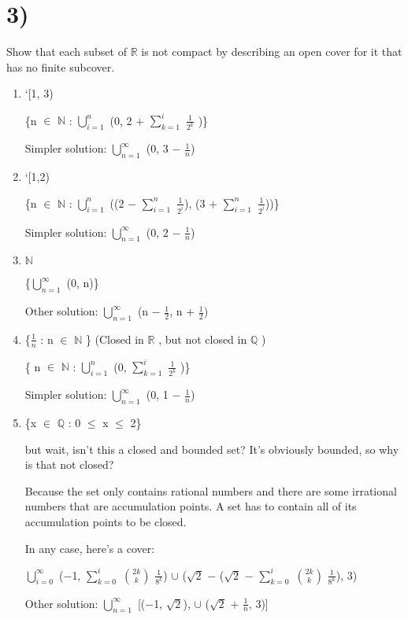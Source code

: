 \documentclass{article}
\newcommand{\mt}[1]{\ensuremath{#1}}
\newcommand\bsc[2][\DefaultOpt]{%
  \def\DefaultOpt{#2}%
  \section[#1]{#2}%
}
\newcommand{\balist}{\begin{enumerate}[label=\alph*.]}
\newcommand{\elist}{\end{enumerate}}
\newcommand{\br}{\mt{\mathbb{R}} }       %
\newcommand{\bq}{\mt{\mathbb{Q}} }       %
\newcommand{\bn}{\mt{\mathbb{N}} }       %
\newcommand{\mem}{\mt{\in} }
\newcommand{\frc}[2]{\mt{\frac{#1}{#2}}}
\newcommand{\urng}[2]{\mt{\bigcup_{#1}^{#2}}}
\newcommand{\nck}[2]{\mt{{#1 \choose #2}}}
\begin{document}
\bsc{3)}{
Show that each subset of \br is not compact by describing an open cover for it that has no finite subcover.

\balist
\item `[1, 3) 
	
	\{n \mem \bn : \urng{i = 1}{n} (0, 2 + $\sum_{k = 1}^i$ \frc{1}{2^k} )\}
	
	Simpler solution: \urng{n = 1}{\infty} (0, 3 $-$ \frc{1}{n})
\item `[1,2)
	
	\{n \mem \bn : \urng{i = 1}{n} ((2 $-$ $\sum_{i = 1}^n$ \frc{1}{2^i}), (3 $+$ $\sum_{i = 1}^n$ \frc{1}{2^i}))\}
	
	Simpler solution: \urng{n = 1}{\infty} (0, 2 $-$ \frc{1}{n})
\item \bn
	
	\{\urng{n = 1}{\infty} (0, n)\}
	
	Other solution: \urng{n = 1}{\infty} (n $-$ \frc{1}{2}, n $+$ \frc{1}{2})
\item \{\frc{1}{n} : n \mem \bn\} (Closed in \br, but not closed in \bq)
	
	\{ n \mem \bn: \urng{i = 1}{n} (0, $\sum_{k = 1}^i$ \frc{1}{2^k} )\}
	
	Simpler solution: \urng{n = 1}{\infty} (0, 1 $-$ \frc{1}{n})
\item \{x \mem \bq : 0 $\leq$ x $\leq$ 2\} 
	
	but wait, isn't this a closed and bounded set? It's obviously bounded, so why is that not closed?
	
	Because the set only contains rational numbers and there are some irrational numbers that are accumulation points. A set has to contain all of its accumulation points to be closed.
	
	In any case, here's a cover:
	
	\urng{i = 0}{\infty} ($-$1, $\sum_{k = 0}^i$ \nck{2k}{k} $\frac{1}{8^k}$) $\cup$ ($\sqrt{2}$ $-$ ($\sqrt{2}$ $-$ $\sum_{k = 0}^i$ \nck{2k}{k} $\frac{1}{8^k}$), 3)
	
	Other solution: \urng{n = 1}{\infty} [($-$1, $\sqrt{2}$), $\cup$ ($\sqrt{2}$ $+$ \frc{1}{n}, 3)]
	
\elist

}
\end{document}
